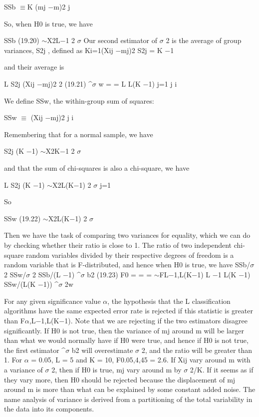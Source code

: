 SSb $\equiv$K (mj $-$m)2 j

So, when H0 is true, we have

SSb (19.20) $\sim$X2L$-$1 2 $\sigma$ Our second estimator of $\sigma$ 2 is the average of group variances, S2j , defined as Ki=1(Xij $-$mj)2 S2j = K $-$1

and their average is

L S2j (Xij $-$mj)2 2 (19.21) \textasciicircum{}$\sigma$ w = = L L(K $-$1) j=1 j i

We define SSw, the within-group sum of squares:

SSw $\equiv$ (Xij $-$mj)2 j i

Remembering that for a normal sample, we have

S2j (K $-$1) $\sim$X2K$-$1 2 $\sigma$

and that the sum of chi-squares is also a chi-square, we have

L S2j (K $-$1) $\sim$X2L(K$-$1) 2 $\sigma$ j=1

So

SSw (19.22) $\sim$X2L(K$-$1) 2 $\sigma$

Then we have the task of comparing two variances for equality, which we can do by checking whether their ratio is close to 1. The ratio of two independent chi-square random variables divided by their respective degrees of freedom is a random variable that is F-distributed, and hence when H0 is true, we have SSb/$\sigma$ 2 SSw/$\sigma$ 2 SSb/(L $-$1) \textasciicircum{}$\sigma$ b2 (19.23) F0 = = = $\sim$FL$-$1,L(K$-$1) L $-$1 L(K $-$1) SSw/(L(K $-$1)) \textasciicircum{}$\sigma$ 2w

For any given significance value $\alpha$, the hypothesis that the L classification algorithms have the same expected error rate is rejected if this statistic is greater than F$\alpha$,L$-$1,L(K$-$1). Note that we are rejecting if the two estimators disagree significantly. If H0 is not true, then the variance of mj around m will be larger than what we would normally have if H0 were true, and hence if H0 is not true, the first estimator \textasciicircum{}$\sigma$ b2 will overestimate $\sigma$ 2, and the ratio will be greater than 1. For $\alpha$ = 0.05, L = 5 and K = 10, F0.05,4,45 = 2.6. If Xij vary around m with a variance of $\sigma$ 2, then if H0 is true, mj vary around m by $\sigma$ 2/K. If it seems as if they vary more, then H0 should be rejected because the displacement of mj around m is more than what can be explained by some constant added noise. The name analysis of variance is derived from a partitioning of the total variability in the data into its components.

